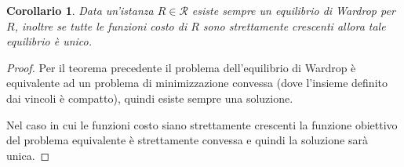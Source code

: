 \documentclass[a4paper]{article}
\theoremstyle{plain}
\newtheorem{mycor}[myteo]{Corollario}
\theoremstyle{definition}
\theoremstyle{remark}
\begin{document}
\begin{mycor}
  Data un'istanza $R\in \mathcal{R}$ esiste sempre un equilibrio di
  Wardrop per $R$, inoltre se tutte le funzioni costo di $R$ sono
  strettamente crescenti allora tale equilibrio è unico.
\end{mycor}
\begin{proof}
  Per il teorema precedente il problema dell'equilibrio di Wardrop è
  equivalente ad un problema di minimizzazione convessa (dove
  l'insieme definito dai vincoli è compatto), quindi esiste sempre una
  soluzione.

  Nel caso in cui le funzioni costo siano strettamente crescenti la
  funzione obiettivo del problema equivalente è strettamente convessa
  e quindi la soluzione sarà unica.
\end{proof}
\end{document}
